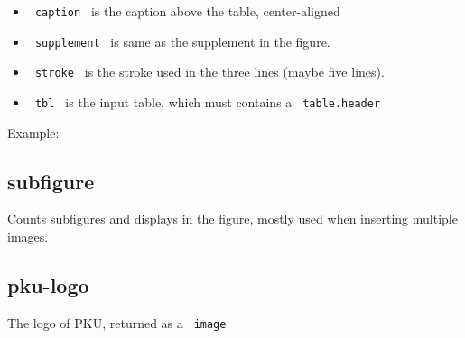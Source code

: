 \begin{itemize}
\tightlist
\item
  \texttt{\ caption\ } is the caption above the table, center-aligned
\item
  \texttt{\ supplement\ } is same as the supplement in the figure.
\item
  \texttt{\ stroke\ } is the stroke used in the three lines (maybe five
  lines).
\item
  \texttt{\ tbl\ } is the input table, which must contains a
  \texttt{\ table.header\ }
\end{itemize}

Example:

\begin{Shaded}
\begin{Highlighting}[]
\NormalTok{    [Data1], [Data2], [Data3], [Data4],}
\NormalTok{  )}
\NormalTok{)}
\end{Highlighting}
\end{Shaded}

\subsection{subfigure}\label{subfigure}

Counts subfigures and displays in the figure, mostly used when inserting
multiple images.

\begin{Shaded}
\begin{Highlighting}[]
\end{Highlighting}
\end{Shaded}

\subsection{pku-logo}\label{pku-logo}

The logo of PKU, returned as a \texttt{\ image\ }

\begin{Shaded}
\begin{Highlighting}[]
\end{Highlighting}
\end{Shaded}


